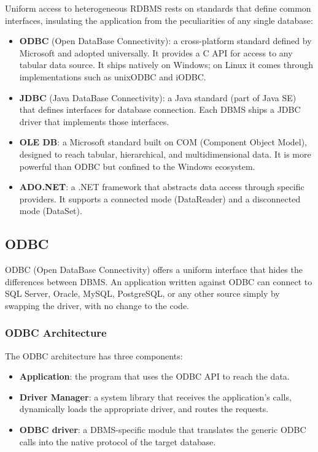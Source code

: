 Uniform access to heterogeneous RDBMS rests on standards that define common interfaces, insulating the application from the peculiarities of any single database:

\begin{itemize}
    \item \textbf{ODBC} (Open DataBase Connectivity): a cross-platform standard defined by Microsoft and adopted universally. It provides a C API for access to any tabular data source. It ships natively on Windows; on Linux it comes through implementations such as unixODBC and iODBC.
    \item \textbf{JDBC} (Java DataBase Connectivity): a Java standard (part of Java SE) that defines interfaces for database connection. Each DBMS ships a JDBC driver that implements those interfaces.
    \item \textbf{OLE DB}: a Microsoft standard built on COM (Component Object Model), designed to reach tabular, hierarchical, and multidimensional data. It is more powerful than ODBC but confined to the Windows ecosystem.
    \item \textbf{ADO.NET}: a .NET framework that abstracts data access through specific providers. It supports a connected mode (DataReader) and a disconnected mode (DataSet).
\end{itemize}

\subsection{ODBC}
\label{sec:odbc}

ODBC (Open DataBase Connectivity) offers a uniform interface that hides the differences between DBMS. An application written against ODBC can connect to SQL Server, Oracle, MySQL, PostgreSQL, or any other source simply by swapping the driver, with no change to the code.

\subsubsection{ODBC Architecture}
\label{subsec:odbc-architecture}

The ODBC architecture has three components:

\begin{itemize}
    \item \textbf{Application}: the program that uses the ODBC API to reach the data.
    \item \textbf{Driver Manager}: a system library that receives the application's calls, dynamically loads the appropriate driver, and routes the requests.
    \item \textbf{ODBC driver}: a DBMS-specific module that translates the generic ODBC calls into the native protocol of the target database.
\end{itemize}

